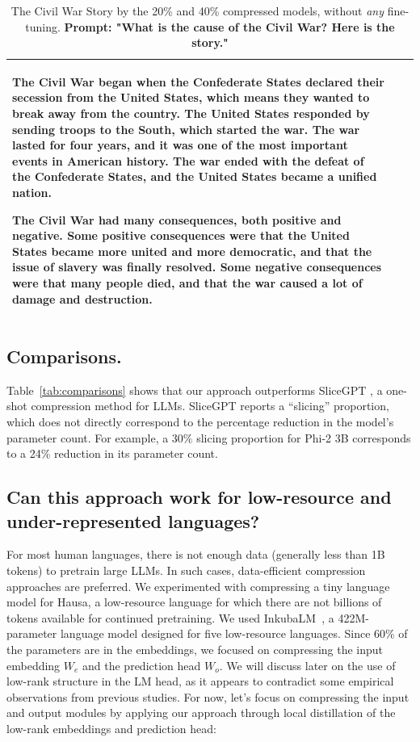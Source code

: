 \begin{table}
\begin{tabular}{ p{} | p{} | p{} }
The Civil War began when the Confederate States declared their secession from the United States, which means they wanted to break away from the country. The United States responded by sending troops to the South, which started the war. The war lasted for four years, and it was one of the most important events in American history. The war ended with the defeat of the Confederate States, and the United States became a unified nation.

The Civil War had many consequences, both positive and negative. Some positive consequences were that the United States became more united and more democratic, and that the issue of slavery was finally resolved. Some negative consequences were that many people died, and that the war caused a lot of damage and destruction.
\\
\bottomrule
\end{tabular}
\caption{The Civil War Story by the 20\% and 40\% compressed models, without \textit{any} fine-tuning. \textbf{Prompt: "What is the cause of the Civil War? Here is the story."}}
\label{tab:cw}
\end{table}

\subsection{Comparisons.}
Table~\ref{tab:comparisons} shows that our approach outperforms SliceGPT \citep{ashkboos_slicegpt_2024}, a one-shot compression method for LLMs.
SliceGPT reports a ``slicing'' proportion, which does not directly correspond to the percentage reduction in the model's parameter count.
For example, a 30\% slicing proportion for Phi-2 3B corresponds to a 24\% reduction in its parameter count.

\subsection{Can this approach work for low-resource and under-represented languages?}
\label{sec:hausa-ch2}

For most human languages, there is not enough data (generally less than 1B tokens) to pretrain large LLMs. In such cases, data-efficient compression approaches are preferred. We experimented with compressing a tiny language model for Hausa, a low-resource language for which there are not billions of tokens available for continued pretraining. We used InkubaLM~\citep{tonja2024inkubalm}, a 422M-parameter language model designed for five low-resource languages. Since 60\% of the parameters are in the embeddings, we focused on compressing the input embedding $W_{e}$ and the prediction head $W_{o}$. We will discuss later on the use of low-rank structure in the LM head, as it appears to contradict some empirical observations from previous studies. For now, let's focus on compressing the input and output modules by applying our approach through local distillation of the low-rank embeddings and prediction head:

